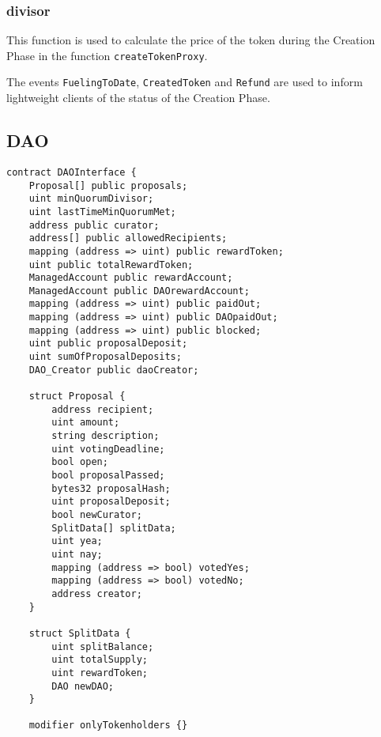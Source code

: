 \documentclass[9pt,oneside]{amsart}
\begin{document}
\begin{multicols}{2}
\subsubsection*{divisor}
This function is used to calculate the price of the token during the Creation Phase in the function \verb|createTokenProxy|.

The events \verb|FuelingToDate|, \verb|CreatedToken| and \verb|Refund| are used to inform lightweight clients of the status of the Creation Phase.
\end{multicols}

\subsection{DAO} \label{DAO}
\begin{verbatim}
contract DAOInterface {
    Proposal[] public proposals;
    uint minQuorumDivisor;
    uint lastTimeMinQuorumMet;
    address public curator;
    address[] public allowedRecipients;
    mapping (address => uint) public rewardToken;
    uint public totalRewardToken;
    ManagedAccount public rewardAccount;
    ManagedAccount public DAOrewardAccount;
    mapping (address => uint) public paidOut;
    mapping (address => uint) public DAOpaidOut;
    mapping (address => uint) public blocked;
    uint public proposalDeposit;
    uint sumOfProposalDeposits;
    DAO_Creator public daoCreator;

    struct Proposal {
        address recipient;
        uint amount;
        string description;
        uint votingDeadline;
        bool open;
        bool proposalPassed;
        bytes32 proposalHash;
        uint proposalDeposit;
        bool newCurator;
        SplitData[] splitData;
        uint yea;
        uint nay;
        mapping (address => bool) votedYes;
        mapping (address => bool) votedNo;
        address creator;
    }

    struct SplitData {
        uint splitBalance;
        uint totalSupply;
        uint rewardToken;
        DAO newDAO;
    }

    modifier onlyTokenholders {}
  

\end{verbatim}
\end{document}
